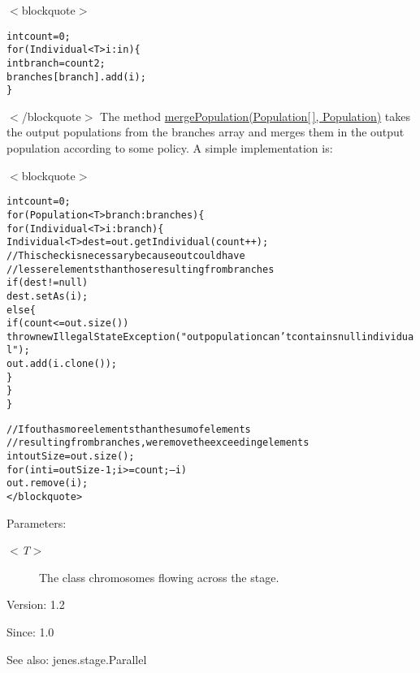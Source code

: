 $<$blockquote$>$\small\begin{alltt}		
 	int count=0;	
 	for( Individual<T> i : in ) \{
 		int branch=count2;
 			branches[branch].add(i);
 	\}
 \end{alltt}
\normalsize 
$<$/blockquote$>$ The method \hyperlink{}{mergePopulation(Population\mbox{[}$\,$\mbox{]}, Population)} takes the output populations from the branches array and merges them in the output population according to some policy. A simple implementation is: 

$<$blockquote$>$\small\begin{alltt}
 	int count = 0;
 	for(Population<T>  branch : branches) \{
 		for(Individual<T> i : branch) \{
 			Individual<T> dest = out.getIndividual(count++);
 			// This check is necessary because out could have
 			// lesser elements than those resulting from branches
 			if( dest != null )
 				dest.setAs(i);
 			else\{
 				if(count<=out.size())
 					throw new IllegalStateException("out population can't contains null individual");
 				out.add(i.clone());
 			\}
 		\}
 	\}\end{alltt}
\normalsize 


\small\begin{alltt} 	// If out has more elements than the sum of elements
 	// resulting from branches, we remove the exceeding elements
 	int outSize=out.size();
 	for( int i = outSize-1; i >= count; --i )
 		out.remove(i);
 </blockquote>\end{alltt}
\normalsize 
 

\begin{Desc}
\item[Parameters:]
\begin{description}
\item[{\em $<$T$>$}]The class chromosomes flowing across the stage.\end{description}
\end{Desc}
\begin{Desc}
\item[Version:]1.2 \end{Desc}
\begin{Desc}
\item[Since:]1.0\end{Desc}
\begin{Desc}
\item[See also:]jenes.stage.Parallel \end{Desc}


